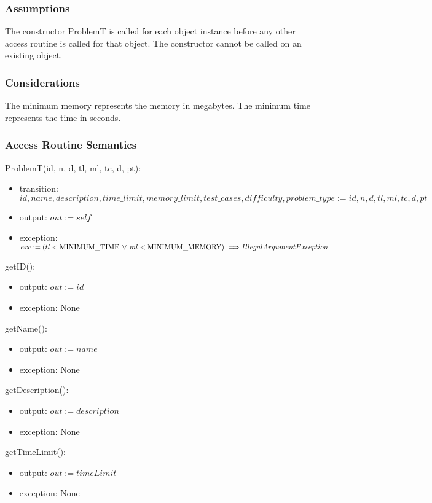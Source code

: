 \documentclass[12pt, titlepage]{article}
\begin{document}
\subsubsection{Assumptions}
The constructor ProblemT is called for each object instance before any other access routine is called for that object. The constructor cannot be called on an existing object.

\subsubsection{Considerations}
The minimum memory represents the memory in megabytes. The minimum time represents the time in seconds.

\subsubsection{Access Routine Semantics}

\noindent ProblemT(id, n, d, tl, ml, tc, d, pt):
\begin{itemize}
\item transition: $id, name, description, time\_limit, memory\_limit, test\_cases, difficulty, problem\_type := id, n, d, tl, ml, tc, d, pt$
\item output: $out := self$
\item exception: $exc := (tl < \text{MINIMUM\_TIME} \, \lor \, ml < \text{MINIMUM\_MEMORY}) \implies \\IllegalArgumentException$
\end{itemize}

\noindent getID():
\begin{itemize}
\item output: $out := id$
\item exception: None
\end{itemize}

\noindent getName():
\begin{itemize}
\item output: $out := name$
\item exception: None
\end{itemize}

\noindent getDescription():
\begin{itemize}
\item output: $out := description$
\item exception: None
\end{itemize}

\noindent getTimeLimit():
\begin{itemize}
\item output: $out := timeLimit$
\item exception: None
\end{itemize}
\end{document}
